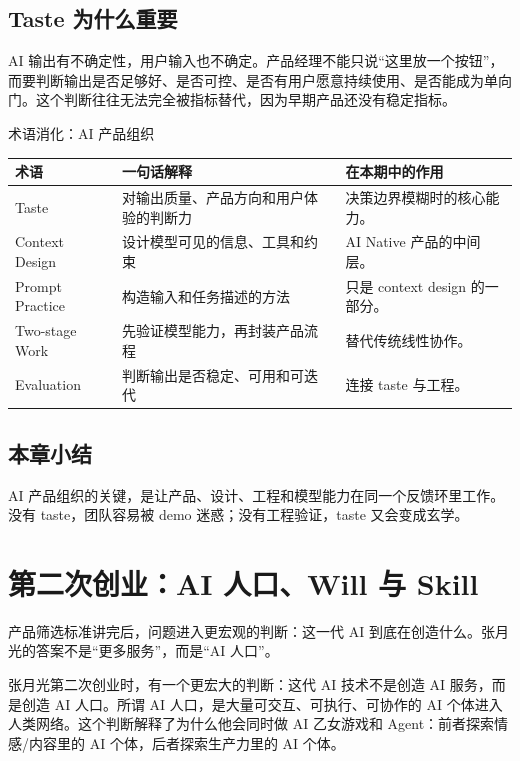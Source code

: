 \documentclass[a4paper]{article}
\begin{document}
\subsection{Taste 为什么重要}

AI 输出有不确定性，用户输入也不确定。产品经理不能只说“这里放一个按钮”，而要判断输出是否足够好、是否可控、是否有用户愿意持续使用、是否能成为单向门。这个判断往往无法完全被指标替代，因为早期产品还没有稳定指标。

\begin{knowledgebox}{术语消化：AI 产品组织}
\begin{tabularx}{\textwidth}{p{}p{}X}
\toprule
术语 & 一句话解释 & 在本期中的作用 \\
\midrule
Taste & 对输出质量、产品方向和用户体验的判断力 & 决策边界模糊时的核心能力。 \\
Context Design & 设计模型可见的信息、工具和约束 & AI Native 产品的中间层。 \\
Prompt Practice & 构造输入和任务描述的方法 & 只是 context design 的一部分。 \\
Two-stage Work & 先验证模型能力，再封装产品流程 & 替代传统线性协作。 \\
Evaluation & 判断输出是否稳定、可用和可迭代 & 连接 taste 与工程。 \\
\bottomrule
\end{tabularx}
\end{knowledgebox}

\subsection{本章小结}

AI 产品组织的关键，是让产品、设计、工程和模型能力在同一个反馈环里工作。没有 taste，团队容易被 demo 迷惑；没有工程验证，taste 又会变成玄学。

\section{第二次创业：AI 人口、Will 与 Skill}

产品筛选标准讲完后，问题进入更宏观的判断：这一代 AI 到底在创造什么。张月光的答案不是“更多服务”，而是“AI 人口”。

张月光第二次创业时，有一个更宏大的判断：这代 AI 技术不是创造 AI 服务，而是创造 AI 人口。所谓 AI 人口，是大量可交互、可执行、可协作的 AI 个体进入人类网络。这个判断解释了为什么他会同时做 AI 乙女游戏和 Agent：前者探索情感/内容里的 AI 个体，后者探索生产力里的 AI 个体。
\end{document}
